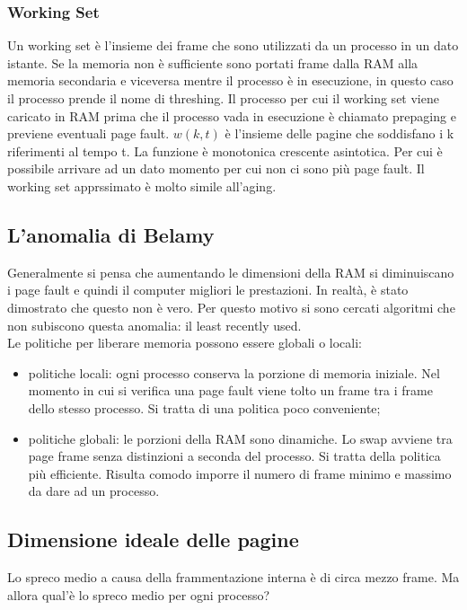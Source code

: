 \documentclass{article}
\begin{document}
\subsubsection{Working Set}
Un working set è l'insieme dei frame che sono utilizzati da un processo in un dato istante. Se la memoria non è sufficiente sono portati frame dalla RAM alla memoria secondaria e viceversa mentre il processo è in esecuzione, in questo caso il processo prende il nome di threshing. Il processo per cui il working set viene caricato in RAM prima che il processo vada in esecuzione è chiamato prepaging e previene eventuali page fault.
$w(k, t)$ è l'insieme delle pagine che soddisfano i k riferimenti al tempo t. La funzione è monotonica crescente asintotica. Per cui è possibile arrivare ad un dato momento per cui non ci sono più page fault. Il working set apprssimato è molto simile all'aging.

\subsection{L'anomalia di Belamy}
Generalmente si pensa che aumentando le dimensioni della RAM si diminuiscano i page fault e quindi il computer migliori le prestazioni. In realtà, è stato dimostrato che questo non è vero. Per questo motivo si sono cercati algoritmi che non subiscono questa anomalia: il least recently used.\\

Le politiche per liberare memoria possono essere globali o locali: 
\begin{itemize}
	\item politiche locali: ogni processo conserva la porzione di memoria iniziale. Nel momento in cui si verifica una page fault viene tolto un frame tra i frame dello stesso processo. Si tratta di una politica poco conveniente;

	\item politiche globali: le porzioni della RAM sono dinamiche. Lo swap avviene tra page frame senza distinzioni a seconda del processo. Si tratta della politica più efficiente. Risulta comodo imporre il numero di frame minimo e massimo da dare ad un processo.
\end{itemize}


\subsection{Dimensione ideale delle pagine}
Lo spreco medio a causa della frammentazione interna è di circa mezzo frame. Ma allora qual'è lo spreco medio per ogni processo?
\end{document}
